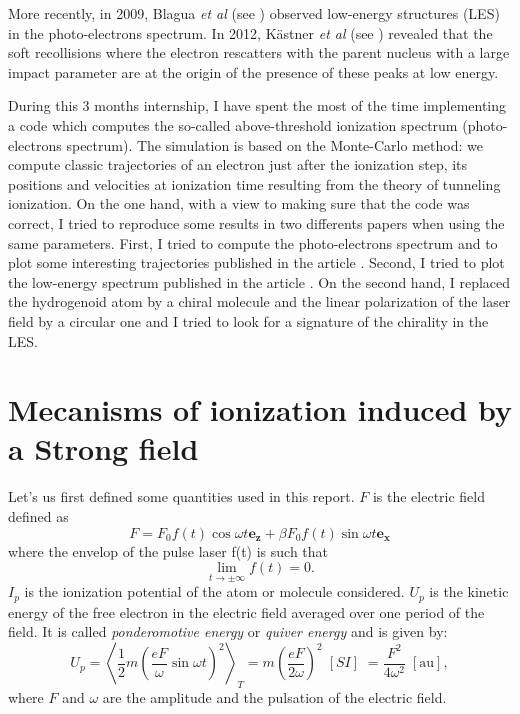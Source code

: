 \documentclass[a4paper]{article}
\begin{document}
\par
More recently, in 2009, Blagua \textit{et al} (see \cite{Blaga_2009}) observed low-energy structures (LES) in the photo-electrons spectrum. In 2012, K\"astner \textit{et al} (see \cite{Kastner_2012_soft-recollision}) revealed that the soft recollisions where the electron rescatters with the parent nucleus with a large impact parameter are at the origin of the presence of these peaks at low energy.
\par
During this 3 months internship, I have spent the most of the time implementing a code which computes the so-called above-threshold ionization spectrum (photo-electrons spectrum). The simulation is based on the Monte-Carlo method: we compute classic trajectories of an electron just after the ionization step, its positions and velocities at ionization time resulting from the theory of tunneling ionization. 
On the one hand, with a view to making sure that the code was correct, I tried to reproduce some results in two differents papers when using the same parameters. First, I tried to compute the photo-electrons spectrum and to plot some interesting trajectories published in the article \cite{Hu_1997}. Second, I tried to plot the low-energy spectrum published in the article \cite{Kastner_2012_pulse}.
On the second hand, I replaced the hydrogenoid atom by a chiral molecule and the linear polarization of the laser field by a circular one and I tried to look for a signature of the chirality in the LES.



\section{Mecanisms of ionization induced by a Strong field}
Let's us first defined some quantities used in this report. $F$ is the electric field defined as
\begin{equation}
\label{electric_field}
F=F_{0} f(t)\cos{\omega t} \mathbf{e_{z}} + \beta F_{0} f(t)\sin{\omega t} \mathbf{e_{x}}
\end{equation}
where the envelop of the pulse laser f(t) is such that
\begin{equation}
\label{envelop}
 \lim_{t\to\pm\infty} f(t)=0.
\end{equation}
$I_{p}$ is the ionization potential of the atom or molecule considered. $U_{p}$ is the kinetic energy of the free electron in the electric field averaged over one period of the field. It is called \textit{ponderomotive energy} or \textit{quiver energy} and is given by:
\begin{equation}
U_{p}=\left< \frac{1}{2}m \left(\frac{eF}{\omega}\sin{\omega t} \right)^{2} \right>_{T} = m \left( \frac{eF}{2\omega} \right)^{2} \; [SI] \; = \frac{F^{2}}{4\omega^{2}} \; [\text{au}],
\end{equation}  
where $F$ and $\omega$ are the amplitude and the pulsation of the electric field.
\end{document}
